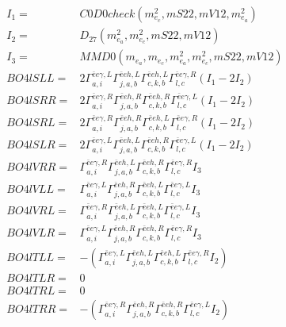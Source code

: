 \documentclass[A4,landscape]{article}
\begin{document}
\begin{align} 
I_1 = & C0D0check(m^2_{e_{{c}}}, mS22, mV12, m^2_{e_{{a}}}) \\ 
I_2 = & D_{27}(m^2_{e_{{a}}}, m^2_{e_{{c}}}, mS22, mV12) \\ 
I_3 = & MMD0(m_{e_{{a}}}, m_{e_{{c}}}, m^2_{e_{{a}}}, m^2_{e_{{c}}}, mS22, mV12) \\ 
  BO4lSLL= & 2  \Gamma^{\bar{e}e \gamma ,L}_{a, i} \Gamma^{\bar{e}e h ,L}_{j, a, b} \Gamma^{\bar{e}e h ,L}_{c, k, b} \Gamma^{\bar{e}e \gamma ,R}_{l, c} (I_1 - 2 I_2) \\ 
  BO4lSRR= & 2  \Gamma^{\bar{e}e \gamma ,R}_{a, i} \Gamma^{\bar{e}e h ,R}_{j, a, b} \Gamma^{\bar{e}e h ,R}_{c, k, b} \Gamma^{\bar{e}e \gamma ,L}_{l, c} (I_1 - 2 I_2) \\ 
  BO4lSRL= & 2  \Gamma^{\bar{e}e \gamma ,R}_{a, i} \Gamma^{\bar{e}e h ,R}_{j, a, b} \Gamma^{\bar{e}e h ,L}_{c, k, b} \Gamma^{\bar{e}e \gamma ,R}_{l, c} (I_1 - 2 I_2) \\ 
  BO4lSLR= & 2  \Gamma^{\bar{e}e \gamma ,L}_{a, i} \Gamma^{\bar{e}e h ,L}_{j, a, b} \Gamma^{\bar{e}e h ,R}_{c, k, b} \Gamma^{\bar{e}e \gamma ,L}_{l, c} (I_1 - 2 I_2) \\ 
  BO4lVRR= &  \Gamma^{\bar{e}e \gamma ,R}_{a, i} \Gamma^{\bar{e}e h ,L}_{j, a, b} \Gamma^{\bar{e}e h ,R}_{c, k, b} \Gamma^{\bar{e}e \gamma ,R}_{l, c} I_3 \\ 
  BO4lVLL= &  \Gamma^{\bar{e}e \gamma ,L}_{a, i} \Gamma^{\bar{e}e h ,R}_{j, a, b} \Gamma^{\bar{e}e h ,L}_{c, k, b} \Gamma^{\bar{e}e \gamma ,L}_{l, c} I_3 \\ 
  BO4lVRL= &  \Gamma^{\bar{e}e \gamma ,R}_{a, i} \Gamma^{\bar{e}e h ,L}_{j, a, b} \Gamma^{\bar{e}e h ,L}_{c, k, b} \Gamma^{\bar{e}e \gamma ,L}_{l, c} I_3 \\ 
  BO4lVLR= &  \Gamma^{\bar{e}e \gamma ,L}_{a, i} \Gamma^{\bar{e}e h ,R}_{j, a, b} \Gamma^{\bar{e}e h ,R}_{c, k, b} \Gamma^{\bar{e}e \gamma ,R}_{l, c} I_3 \\ 
  BO4lTLL= & -( \Gamma^{\bar{e}e \gamma ,L}_{a, i} \Gamma^{\bar{e}e h ,L}_{j, a, b} \Gamma^{\bar{e}e h ,L}_{c, k, b} \Gamma^{\bar{e}e \gamma ,R}_{l, c} I_2) \\ 
  BO4lTLR= & 0 \\ 
  BO4lTRL= & 0 \\ 
  BO4lTRR= & -( \Gamma^{\bar{e}e \gamma ,R}_{a, i} \Gamma^{\bar{e}e h ,R}_{j, a, b} \Gamma^{\bar{e}e h ,R}_{c, k, b} \Gamma^{\bar{e}e \gamma ,L}_{l, c} I_2) \\ 
\end{align} 
\end{document}

